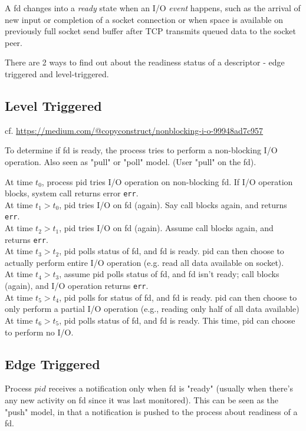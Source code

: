 \documentclass[10pt]{amsart}
\begin{document}
A fd changes into a \emph{ready} state when an I/O \emph{event} happens, such as the arrival of new input or completion of a socket connection or when space is available on previously full socket send buffer after TCP transmits queued data to the socket peer.

There are 2 ways to find out about the readiness status of a descriptor - edge triggered and level-triggered.

\subsection{Level Triggered}

cf. \url{https://medium.com/@copyconstruct/nonblocking-i-o-99948ad7c957}

To determine if fd is ready, the process tries to perform a non-blocking I/O operation. Also seen as "pull" or "poll" model. (User "pull" on the fd).

At time $t_0$, process pid tries I/O operation on non-blocking fd. If I/O operation blocks, system call returns error \texttt{err}. \\
At time $t_1 > t_0$, pid tries I/O on fd (again). Say call blocks again, and returns \texttt{err}. \\
At time $t_2 > t_1$, pid tries I/O on fd (again). Assume call blocks again, and returns \texttt{err}. \\
At time $t_3 > t_2$, pid polls status of fd, and fd is ready. pid can then choose to actually perform entire I/O operation (e.g. read all data available on socket). \\
At time $t_4 > t_3$, assume pid polls status of fd, and fd isn't ready; call blocks (again), and I/O operation returns \texttt{err}. \\
At time $t_5 > t_4$, pid polls for status of fd, and fd is ready. pid can then choose to only perform a partial I/O operation (e.g., reading only half of all data available) \\
At time $t_6 > t_5$, pid polls status of fd, and fd is ready. This time, pid can choose to perform no I/O.

\subsection{Edge Triggered}

Process $pid$ receives a notification only when fd is "ready" (usually when there's any new activity on fd since it was last monitored). This can be seen as the "push" model, in that a notification is pushed to the process about readiness of a fd.
\end{document}
